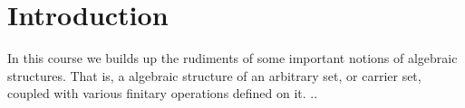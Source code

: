 
\section{Introduction} %
\label{sec:introduction}
In this course we builds up the rudiments of some important notions of algebraic structures.
That is, a algebraic structure of an arbitrary set, or carrier set, coupled with various finitary operations defined on it.
..

